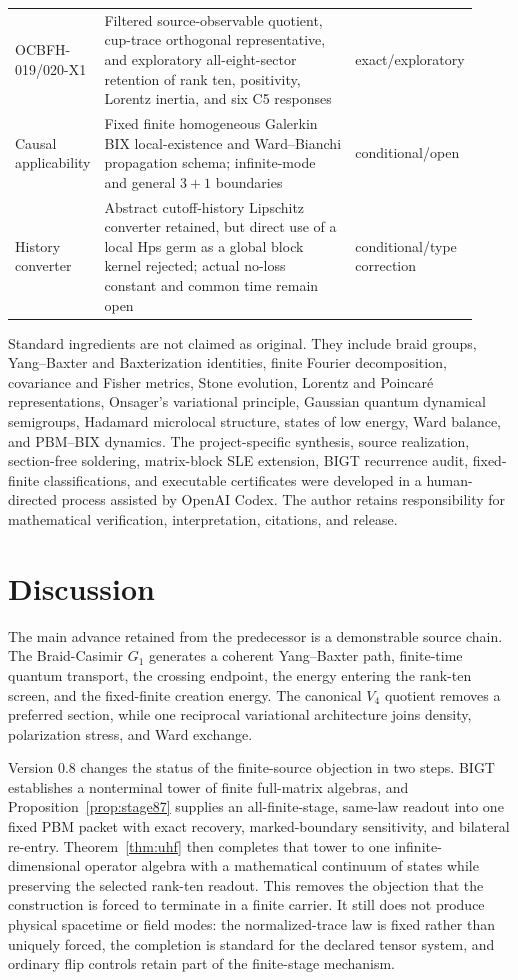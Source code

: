 \documentclass[11pt]{article}
\theoremstyle{definition}
\theoremstyle{remark}
\begin{document}
\begin{longtable}{@{}p{0.16\linewidth}p{0.58\linewidth}p{0.18\linewidth}@{}}
OCBFH-019/020-X1 & Filtered source-observable quotient, cup-trace orthogonal representative, and exploratory all-eight-sector retention of rank ten, positivity, Lorentz inertia, and six C5 responses & exact/exploratory\\
Causal applicability & Fixed finite homogeneous Galerkin BIX local-existence and Ward--Bianchi propagation schema; infinite-mode and general $3+1$ boundaries & conditional/open\\
History converter & Abstract cutoff-history Lipschitz converter retained, but direct use of a local Hps germ as a global block kernel rejected; actual no-loss constant and common time remain open & conditional/type correction\\
\bottomrule
\end{longtable}

Standard ingredients are not claimed as original. They include braid groups, Yang--Baxter and Baxterization identities, finite Fourier decomposition, covariance and Fisher metrics, Stone evolution, Lorentz and Poincar\'e representations, Onsager's variational principle, Gaussian quantum dynamical semigroups, Hadamard microlocal structure, states of low energy, Ward balance, and PBM--BIX dynamics. The project-specific synthesis, source realization, section-free soldering, matrix-block SLE extension, BIGT recurrence audit, fixed-finite classifications, and executable certificates were developed in a human-directed process assisted by OpenAI Codex. The author retains responsibility for mathematical verification, interpretation, citations, and release.

\section{Discussion}

The main advance retained from the predecessor is a demonstrable source chain. The Braid-Casimir $G_1$ generates a coherent Yang--Baxter path, finite-time quantum transport, the crossing endpoint, the energy entering the rank-ten screen, and the fixed-finite creation energy. The canonical $V_4$ quotient removes a preferred section, while one reciprocal variational architecture joins density, polarization stress, and Ward exchange.

Version 0.8 changes the status of the finite-source objection in two steps. BIGT establishes a nonterminal tower of finite full-matrix algebras, and Proposition~\ref{prop:stage87} supplies an all-finite-stage, same-law readout into one fixed PBM packet with exact recovery, marked-boundary sensitivity, and bilateral re-entry. Theorem~\ref{thm:uhf} then completes that tower to one infinite-dimensional operator algebra with a mathematical continuum of states while preserving the selected rank-ten readout. This removes the objection that the construction is forced to terminate in a finite carrier. It still does not produce physical spacetime or field modes: the normalized-trace law is fixed rather than uniquely forced, the completion is standard for the declared tensor system, and ordinary flip controls retain part of the finite-stage mechanism.
\end{document}
